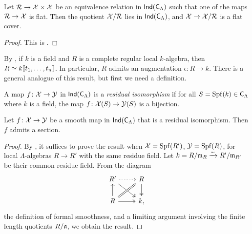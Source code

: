 \begin{theorem}\label{thm:quotients-ind}
Let $\mathcal{R}\to \mathcal{X}\times \mathcal{X}$ be an equivalence relation in 
$\operatorname{\mathsf{Ind}}(\mathsf{C}_\Lambda)$ such that one of the maps $\mathcal{R}\to \mathcal{X}$ is 
flat. Then the quotient $\mathcal{X}/\mathcal{R}$ lies in $\operatorname{\mathsf{Ind}}(\mathsf{C}_\Lambda)$, and 
$\mathcal{X}\to \mathcal{X}/\mathcal{R}$ is a flat cover. 
\end{theorem}
\begin{proof}
This is \cite[VII\textsubscript{B} 1.4]{sga3-1}. 
\end{proof}

By \cite[29.7]{matsumura-1989}, if $k$ is a field and $R$ is a complete regular 
local $k$-algebra, then $R\simeq k\llbracket t_1,\dots,t_n \rrbracket$. In particular, $R$ 
admits an augmentation $\epsilon\colon R\to k$. There is a general analogue of 
this result, but first we need a definition. 

\begin{definition}
A map $f\colon \mathcal{X}\to \mathcal{Y}$ in $\operatorname{\mathsf{Ind}}(\mathsf{C}_\Lambda)$ is a 
\emph{residual isomorphism} if for all $S=\operatorname{Spf}(k)\in \mathsf{C}_\Lambda$ where 
$k$ is a field, the map $f\colon \mathcal{X}(S)\to \mathcal{Y}(S)$ is a bijection. 
\end{definition}

\begin{lemma}\label{thm:smooth-section}
Let $f\colon \mathcal{X}\to \mathcal{Y}$ be a smooth map in $\operatorname{\mathsf{Ind}}(\mathsf{C}_\Lambda)$ 
that is a residual isomorphism. Then $f$ admits a section. 
\end{lemma}
\begin{proof}
By \cite[VII\textsubscript{B} 0.1.1]{sga3-1}, it suffices to prove the result 
when $\mathcal{X}=\operatorname{Spf}(R')$, $\mathcal{Y}=\operatorname{Spf}(R)$, for local $\Lambda$-algebras $R\to R'$ 
with the same residue field. Let $k=R/\mathfrak{m}_R \xrightarrow\sim R'/\mathfrak{m}_{R'}$ be their common 
residue field. From the diagram 
\[
\begin{tikzcd}
	R' \ar[r, dotted] \ar[dr, two heads]
		& R \ar[d, two heads] \\
	R \ar[u] \ar[ur, equal] \ar[r, two heads]
		& k ,
\end{tikzcd}
\]
the definition of formal smoothness, and a limiting argument involving the 
finite length quotients $R/\mathfrak{a}$, we obtain the result. 
\end{proof}

